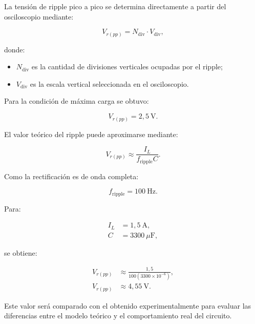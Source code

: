 \documentclass[12pt,a4paper]{article}
\begin{document}
	La tensión de ripple pico a pico se determina directamente a partir del
	osciloscopio mediante:
	
	\begin{equation}
		V_{r(pp)}
		=
		N_{\mathrm{div}}
		\cdot
		V_{\mathrm{div}},
	\end{equation}
	
	donde:
	
	\begin{itemize}
		\item $N_{\mathrm{div}}$ es la cantidad de divisiones verticales ocupadas
		por el ripple;
		
		\item $V_{\mathrm{div}}$ es la escala vertical seleccionada en el
		osciloscopio.
	\end{itemize}
	
	Para la condición de máxima carga se obtuvo:
	
	\begin{equation}
		V_{r(pp)}
		=
		2,5~\text{V}.
	\end{equation}
	
	El valor teórico del ripple puede aproximarse mediante:
	
	\begin{equation}
		V_{r(pp)}
		\approx
		\frac{I_L}
		{f_{\mathrm{ripple}}C}.
	\end{equation}
	
	Como la rectificación es de onda completa:
	
	\begin{equation}
		f_{\mathrm{ripple}}
		=
		100~\text{Hz}.
	\end{equation}
	
	Para:
	
	\begin{align}
		I_L &= 1,5~\text{A},
		\\
		C &= 3300~\mu\text{F},
	\end{align}
	
	se obtiene:
	
	\begin{align}
		V_{r(pp)}
		&\approx
		\frac{1,5}
		{100(3300\times10^{-6})},
		\\
		V_{r(pp)}
		&\approx
		4,55~\text{V}.
	\end{align}
	
	Este valor será comparado con el obtenido experimentalmente para evaluar las
	diferencias entre el modelo teórico y el comportamiento real del circuito.
	
\end{document}
